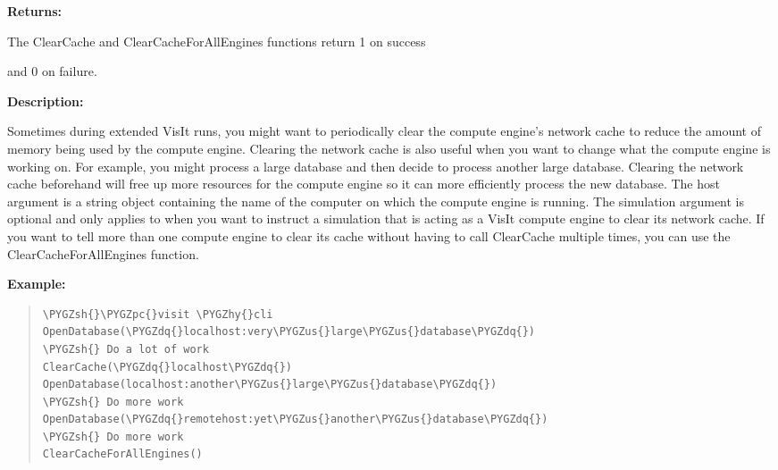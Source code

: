 \documentclass[letterpaper,10pt,english]{sphinxmanual}
\def\PYGZus{\char`\_}
\def\PYGZsh{\char`\#}
\def\PYGZpc{\char`\%}
\def\PYGZhy{\char`\-}
\def\PYGZdq{\char`\"}
\begin{document}
\begin{DUlineblock}{0em}
\item[] 
\item[] \textbf{Returns:}
\item[] The ClearCache and ClearCacheForAllEngines functions return 1 on success
\item[] and 0 on failure.
\item[] 
\item[] \textbf{Description:}
\item[] Sometimes during extended VisIt runs, you might want to periodically clear
the compute engine's network cache to reduce the amount of memory being
used by the compute engine. Clearing the network cache is also useful when
you want to change what the compute engine is working on. For example, you
might process a large database and then decide to process another large
database. Clearing the network cache beforehand will free up more resources
for the compute engine so it can more efficiently process the new database.
The host argument is a string object containing the name of the computer on
which the compute engine is running. The simulation argument is optional
and only applies to when you want to instruct a simulation that is acting
as a VisIt compute engine to clear its network cache. If you want to tell
more than one compute engine to clear its cache without having to call
ClearCache multiple times, you can use the ClearCacheForAllEngines function.
\end{DUlineblock}

\begin{DUlineblock}{0em}
\item[] 
\end{DUlineblock}

\begin{DUlineblock}{0em}
\item[] \textbf{Example:}
\item[] 
\end{DUlineblock}
\begin{quote}

\begin{Verbatim}[commandchars=\\\{\}]
\PYGZsh{}\PYGZpc{}visit \PYGZhy{}cli
OpenDatabase(\PYGZdq{}localhost:very\PYGZus{}large\PYGZus{}database\PYGZdq{})
\PYGZsh{} Do a lot of work
ClearCache(\PYGZdq{}localhost\PYGZdq{})
OpenDatabase(localhost:another\PYGZus{}large\PYGZus{}database\PYGZdq{})
\PYGZsh{} Do more work
OpenDatabase(\PYGZdq{}remotehost:yet\PYGZus{}another\PYGZus{}database\PYGZdq{})
\PYGZsh{} Do more work
ClearCacheForAllEngines()
\end{Verbatim}
\end{quote}
\end{document}
